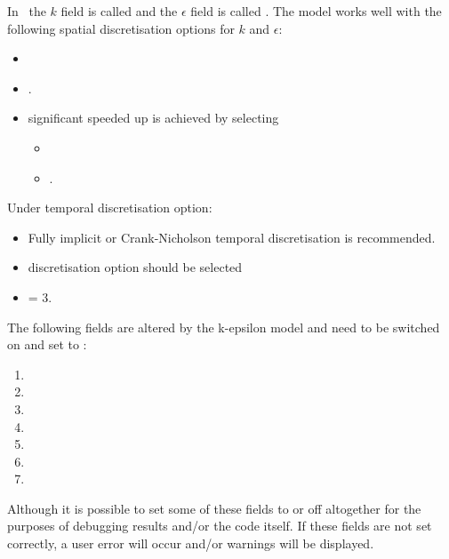 In \fluidity\ the $k$ field is called  and the $\epsilon$
field is called .  The model works well with the following
spatial discretisation options for $k$ and $\epsilon$:
\begin{itemize}
\item
\item {}.
\item significant speeded up is achieved by selecting
  \begin{itemize}
  \item {}
  \item {}.
  \end{itemize}
\end{itemize}

Under temporal discretisation option:
\begin{itemize}
\item Fully implicit or Crank-Nicholson temporal discretisation is recommended.
\item {} discretisation option should be selected
\item {} = 3.
\end{itemize}

The following fields are altered by the k-epsilon model and need to be switched on and set
to :
\begin{enumerate}
\item {}
\item {}
\item {}
\item {}
\item {}
\item {}
\item {}
\end{enumerate}

Although it is possible to set some of these fields to  or off
altogether for the purposes of debugging results and/or the code itself. If these fields
are not set correctly, a user error will occur and/or warnings will be displayed.

